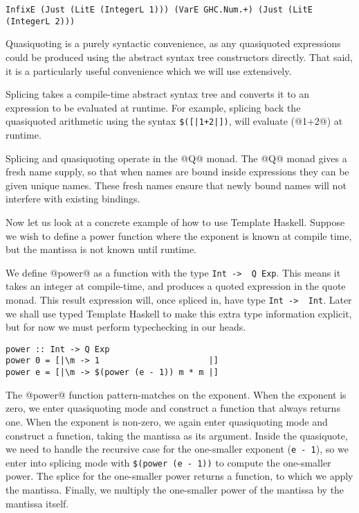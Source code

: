 \begin{lstlisting}
InfixE (Just (LitE (IntegerL 1))) (VarE GHC.Num.+) (Just (LitE (IntegerL 2)))
\end{lstlisting}

Quasiquoting is a purely syntactic convenience, as any quasiquoted expressions could be produced using the abstract syntax tree constructors directly.
That said, it is a particularly useful convenience which we will use extensively.

Splicing takes a compile-time abstract syntax tree and converts it to an expression to be evaluated at runtime.
For example, splicing back the quasiquoted arithmetic using the syntax \lstinline/$([|1+2|])/, will evaluate (@1+2@) at runtime.

Splicing and quasiquoting operate in the @Q@ monad.
The @Q@ monad gives a fresh name supply, so that when names are bound inside expressions they can be given unique names.
These fresh names ensure that newly bound names will not interfere with existing bindings.

Now let us look at a concrete example of how to use Template Haskell.
Suppose we wish to define a power function where the exponent is known at compile time, but the mantissa is not known until runtime.

We define @power@ as a function with the type \lstinline/Int ->  Q Exp/.
This means it takes an integer at compile-time, and produces a quoted expression in the quote monad.
This result expression will, once spliced in, have type \lstinline/Int ->  Int/.
Later we shall use typed Template Haskell to make this extra type information explicit, but for now we must perform typechecking in our heads.

\begin{lstlisting}
power :: Int -> Q Exp
power 0 = [|\m -> 1                      |]
power e = [|\m -> $(power (e - 1)) m * m |]
\end{lstlisting}

The @power@ function pattern-matches on the exponent.
When the exponent is zero, we enter quasiquoting mode and construct a function that always returns one.
When the exponent is non-zero, we again enter quasiquoting mode and construct a function, taking the mantissa as its argument.
Inside the quasiquote, we need to handle the recursive case for the one-smaller exponent (\lstinline/e - 1/), so we enter into splicing mode with \lstinline/$(power (e - 1))/ to compute the one-smaller power.
The splice for the one-smaller power returns a function, to which we apply the mantissa.
Finally, we multiply the one-smaller power of the mantissa by the mantissa itself.


